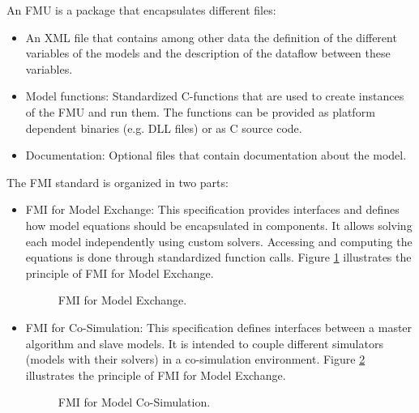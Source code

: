 

An FMU is a package that encapsulates different files:

\begin{itemize}
\item An XML file that contains among other data the definition of the different variables of the models and the description of the dataflow between these variables. 
\item Model functions: Standardized C-functions that are used to create instances of the FMU and run them. The functions can be provided as platform dependent binaries (e.g. DLL files) or as C source code.
\item Documentation: Optional files that contain documentation about the model.
\end{itemize}

The FMI standard is organized in two parts:
\begin{itemize}
\item FMI for Model Exchange:
This specification provides interfaces and defines how model equations should be encapsulated in components. It allows solving each model independently using custom solvers. Accessing and computing the equations is done through standardized function calls. Figure \ref{fig:fmimdlexg} illustrates the principle of FMI for Model Exchange.

\begin{figure}[phbt]
\centering

\caption{FMI for Model Exchange.}
\label{fig:fmimdlexg}
\end{figure}

\item FMI for Co-Simulation:
This specification defines interfaces between a master algorithm and slave models. It is intended to couple different simulators (models with their solvers) in a co-simulation environment. Figure \ref{fig:fmicosim} illustrates the principle of FMI for Model Exchange.

\begin{figure}[phbt]
\centering

\caption{FMI for Model Co-Simulation.}
\label{fig:fmicosim}
\end{figure} 
\end{itemize}

